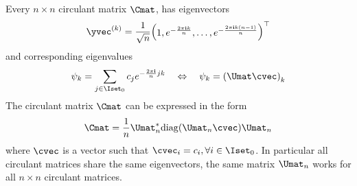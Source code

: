 \begin{theorem} \label{theorem:ch2-diagonalization_circulant_matrix}
  Every $n \times n$ circulant matrix $\Cmat$, has eigenvectors  
  \begin{equation}
    \yvec^{(k)} = \frac{1}{\sqrt{n}} \leftmatrix 1, e^{-\frac{2 \pi \ci k}{n}}, \dots, e^{-\frac{2 \pi \ci k(n-1)}{n}} \rightmatrix^\top
  \end{equation}
  and corresponding eigenvalues
  \begin{equation}
    \psi_k = \sum_{j \in \Iset_0} c_j e^{-\frac{2 \pi \ci}{n} jk} \quad \Leftrightarrow \quad \psi_k = \left( \Umat \cvec \right)_k
  \end{equation}
  The circulant matrix $\Cmat$ can be expressed in the form 
  \begin{equation} \label{equation:ch2-diagonalization_circulant_matrix}
    \Cmat = \frac{1}{n} \Umat_n^* \diag(\Umat_n \cvec) \Umat_n
  \end{equation}
  where $\cvec$ is a vector such that $\cvec_i = c_i, \forall i \in \Iset_0$.
  In particular all circulant matrices share the same eigenvectors, the same matrix $\Umat_n$ works for all $n \times n$ circulant matrices.
\end{theorem}


\begingroup
\allowdisplaybreaks

